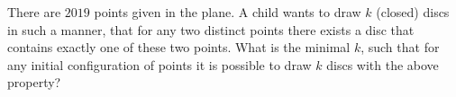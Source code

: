 There are $2019$ points given in the plane. A child wants to draw $k$ (closed) discs in such a manner, that for any two distinct points there exists a disc that contains exactly one of these two points. What is the minimal $k$,  such that for any initial configuration of points it is possible to draw $k$ discs with the above property?